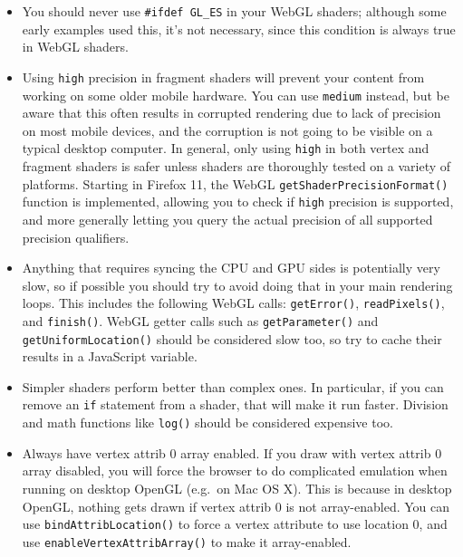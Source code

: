 \begin{itemize}
\tightlist
\item
  You should never use \texttt{\#ifdef\ GL\_ES} in your WebGL shaders;
  although some early examples used this, it's not necessary, since this
  condition is always true in WebGL shaders.
\item
  Using \texttt{high} precision in fragment shaders will prevent your
  content from working on some older mobile hardware. You can use
  \texttt{medium} instead, but be aware that this often results in
  corrupted rendering due to lack of precision on most mobile devices,
  and the corruption is not going to be visible on a typical desktop
  computer. In general, only using \texttt{high} in both vertex and
  fragment shaders is safer unless shaders are thoroughly tested on a
  variety of platforms. Starting in Firefox 11, the WebGL
  \texttt{getShaderPrecisionFormat()} function is implemented, allowing
  you to check if \texttt{high} precision is supported, and more
  generally letting you query the actual precision of all supported
  precision qualifiers.
\item
  Anything that requires syncing the CPU and GPU sides is potentially
  very slow, so if possible you should try to avoid doing that in your
  main rendering loops. This includes the following WebGL calls:
  \texttt{getError()}, \texttt{readPixels()}, and \texttt{finish()}.
  WebGL getter calls such as \texttt{getParameter()} and
  \texttt{getUniformLocation()} should be considered slow too, so try to
  cache their results in a JavaScript variable.
\item
  Simpler shaders perform better than complex ones. In particular, if
  you can remove an \texttt{if} statement from a shader, that will make
  it run faster. Division and math functions like \texttt{log()} should
  be considered expensive too.
\item
  Always have vertex attrib 0 array enabled. If you draw with vertex
  attrib 0 array disabled, you will force the browser to do complicated
  emulation when running on desktop OpenGL (e.g.~on Mac OS X). This is
  because in desktop OpenGL, nothing gets drawn if vertex attrib 0 is
  not array-enabled. You can use \texttt{bindAttribLocation()} to force
  a vertex attribute to use location 0, and use
  \texttt{enableVertexAttribArray()} to make it array-enabled.
\end{itemize}

​
